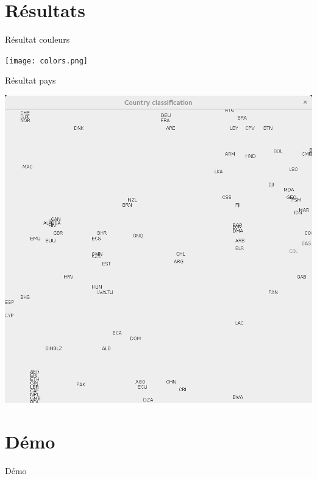 \documentclass[11pt]{beamer}
\begin{document}
\section{Résultats}
\begin{frame}{Résultat couleurs}
\begin{center}

\texttt{[image: colors.png]} 
\end{center}

\end{frame}

\begin{frame}{Résultat pays}
\begin{center}

\includegraphics[scale=0.25]{countries.png} 
\end{center}

\end{frame}

\section{Démo}
\begin{frame}{Démo}
\end{frame}
\end{document}
